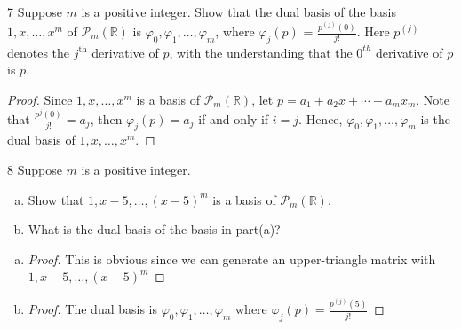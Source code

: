 \documentclass{article}
\newenvironment{problem}[1]{\begin{prob*}{#1}{}}{\end{prob*}}
\newcommand{\R}{\mathbb{R}}
\begin{document}
\begin{problem}{7}
Suppose $m$ is a positive integer. Show that the dual basis of the basis $1, x, \ldots,x^m$ of $\mathcal{P}_m(\R)$ is $\varphi_0, \varphi_1,\ldots, \varphi_{m}$, where $\varphi_j(p)$ = $\frac{p^{(j)}(0)}{j!}$. Here $p^{(j)}$ denotes the $j^{\text{th}}$ derivative of $p$, with the understanding that the $0^{\mathit{th}}$ derivative of $p$ is $p$.
\end{problem}
\begin{proof}
	Since $1, x, \ldots ,x^m$ is a basis of $\mathcal{P}_m(\mathbb{R})$, let $p = a_1 + a_2 x + \cdots + a_m x_m$. Note that $\frac{p^{j}(0)}{j!} = a_j$, then $\varphi_j(p) = a_j$ if and only if $i = j$. Hence, $\varphi_0, \varphi_1, \ldots, \varphi_m$ is the dual basis of $1, x, \ldots, x^m$.
\end{proof}
\begin{problem}{8}
Suppose $m$ is a positive integer.
\begin{enumerate}[(a)]
	\item Show that $1, x-5, \ldots , (x-5)^m$ is a basis of $\mathcal{P}_m(\mathbb{R})$.
	\item What is the dual basis of the basis in part(a)?
\end{enumerate}
\end{problem}
\begin{enumerate}[(a)]
	\item \begin{proof}
		      This is obvious since we can generate an upper-triangle matrix with $1, x-5, \ldots , (x-5)^m$
	      \end{proof}
	\item \begin{proof}
		      The dual basis is $\varphi_0, \varphi_1, \ldots, \varphi_m$ where $\varphi_j(p) = \frac{p^{(j)}(5)}{j!}$
	      \end{proof}
\end{enumerate}
\end{document}
